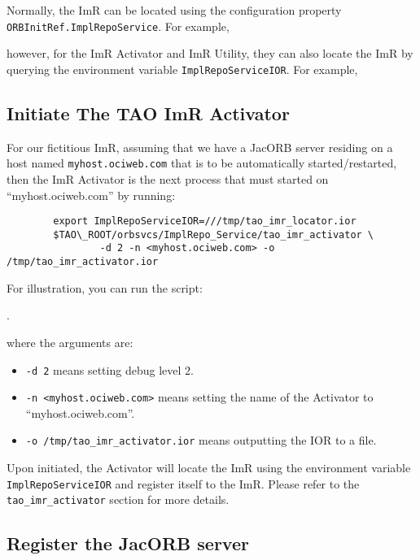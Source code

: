 Normally, the ImR can be located using the configuration  property
{\tt ORBInitRef.ImplRepoService}.  For example,


however, for the ImR Activator and ImR Utility,  they can also locate
the ImR by querying the environment variable {\tt ImplRepoServiceIOR}.
For example,


\subsection{Initiate The TAO ImR Activator}

For our fictitious ImR, assuming that we have a JacORB server residing
on a host named {\tt myhost.ociweb.com} that is to be automatically started/restarted,
then the ImR Activator is the next process that must started on
“myhost.ociweb.com” by running:

\begin{verbatim}
        export ImplRepoServiceIOR=///tmp/tao_imr_locator.ior
        $TAO\_ROOT/orbsvcs/ImplRepo_Service/tao_imr_activator \
                -d 2 -n <myhost.ociweb.com> -o /tmp/tao_imr_activator.ior
\end{verbatim}

For illustration, you can run the script:

.

where the arguments are:
\begin{itemize}
    \item {\tt -d 2} means setting debug level 2.
    \item {\tt -n <myhost.ociweb.com>} means setting the name of the Activator to
              “myhost.ociweb.com”.
    \item {\tt -o /tmp/tao\_imr\_activator.ior} means outputting the IOR to a file.
\end{itemize}


Upon initiated, the Activator will locate the ImR using the environment
variable {\tt ImplRepoServiceIOR} and register itself to the ImR.  Please
refer to the {\tt tao\_imr\_activator} section for more details.

\subsection{Register the JacORB server}

